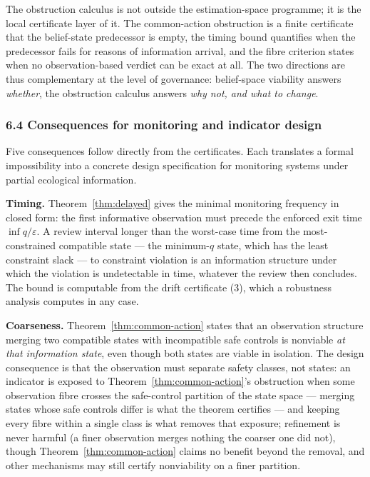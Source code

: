 \documentclass[11pt]{article}
\theoremstyle{definition}
\begin{document}
The obstruction calculus is not outside the estimation-space programme;
it is the local certificate layer of it. The common-action obstruction
is a finite certificate that the belief-state predecessor is empty, the
timing bound quantifies when the predecessor fails for reasons of
information arrival, and the fibre criterion states when no
observation-based verdict can be exact at all. The two directions are
thus complementary at the level of governance: belief-space viability
answers \emph{whether}, the obstruction calculus answers \emph{why not,
and what to change}.

\subsubsection{6.4 Consequences for monitoring and indicator
design}\label{consequences-for-monitoring-and-indicator-design}

Five consequences follow directly from the certificates. Each translates
a formal impossibility into a concrete design specification for
monitoring systems under partial ecological information.

\textbf{Timing.} Theorem~\ref{thm:delayed} gives the minimal monitoring frequency in
closed form: the first informative observation must precede the enforced
exit time \(\inf q / \varepsilon\). A review interval longer than the
worst-case time from the most-constrained compatible state --- the
minimum-\(q\) state, which has the least constraint slack --- to
constraint violation is an information structure under which the
violation is undetectable in time, whatever the review then concludes.
The bound is computable from the drift certificate (3), which a robustness analysis computes in any case.

\textbf{Coarseness.} Theorem~\ref{thm:common-action} states that an observation structure
merging two compatible states with incompatible safe controls is
nonviable \emph{at that information state}, even though both states are
viable in isolation. The design consequence is that the observation must
separate safety classes, not states: an indicator is exposed to Theorem~\ref{thm:common-action}'s obstruction when some observation fibre crosses the safe-control
partition of the state space --- merging states whose safe controls
differ is what the theorem certifies --- and keeping every fibre within
a single class is what removes that exposure; refinement is never harmful (a finer observation merges nothing the coarser one did not), though Theorem~\ref{thm:common-action}
claims no benefit beyond the removal, and other mechanisms may still
certify nonviability on a finer partition.
\end{document}
